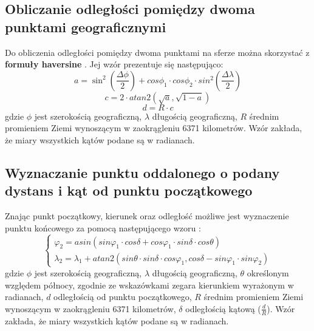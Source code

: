 \subsection{Obliczanie odległości pomiędzy dwoma punktami geograficznymi}
Do obliczenia odległości pomiędzy dwoma punktami na sferze można skorzystać z \textbf{formuły haversine} \cite{haversine}. Jej wzór prezentuje się następująco:\\
\begin{equation}\label{eq:haversine1}
a = \sin ^2(\frac{\Delta  \phi}{2}) + cos  \phi_1 \cdot cos\phi_2 \cdot sin^2(\frac{\Delta \lambda}{2})
\end{equation}
\begin{equation}\label{eq:haversine2}
c = 2 \cdot atan2( \sqrt{a}, \sqrt{1-a})
\end{equation}
\begin{equation}\label{eq:haversine3}
d = R \cdot c
\end{equation}
gdzie \(\phi\) jest szerokością geograficzną, \(\lambda\) długością geograficzną, \(R\) średnim promieniem Ziemi wynoszącym w zaokrągleniu 6371 kilometrów. Wzór zakłada, że miary wszystkich kątów podane są w radianach.

\subsection{Wyznaczanie punktu oddalonego o podany dystans i kąt od punktu początkowego}
Znając punkt początkowy, kierunek oraz odległość możliwe jest wyznaczenie punktu końcowego za pomocą następującego wzoru \cite{haversine}:
\begin{equation}\label{eq:haversine_generowanie_punktu}
\begin{cases}\varphi_2=asin(sin{ \varphi_1 } \cdot cos{ \delta } + cos{\varphi_1} \cdot sin{\delta} \cdot cos{ \theta })\\
\lambda_2 = \lambda_1 + atan2(sin \theta \cdot sin \delta \cdot cos \varphi_1, cos \delta -sin \varphi_1 \cdot sin  \varphi_2 )
\end{cases}
\end{equation}
gdzie \(\phi\) jest szerokością geograficzną, \(\lambda\) długością geograficzną, \(\theta\) określonym względem północy, zgodnie ze wskazówkami zegara kierunkiem wyrażonym w radianach, \(d\) odległością od punktu początkowego,
\(R\) średnim promieniem Ziemi wynoszącym w zaokrągleniu 6371 kilometrów, \(\delta\) odległością kątową (\(\frac{d}{R}\)). Wzór zakłada, że miary wszystkich kątów podane są w radianach.


